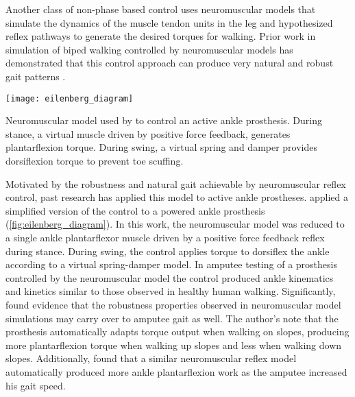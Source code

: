 Another class of non-phase based control uses neuromuscular models that simulate
the dynamics of the muscle tendon units in the leg and hypothesized reflex
pathways to generate the desired torques for walking. Prior work in simulation
of biped walking controlled by neuromuscular models has demonstrated that this
control approach can produce very natural and robust gait patterns
\citep{geyer2010muscle,song2013integration,song2015neural}.
\begin{marginfigure}[1in]
    \centering
    \texttt{[image: eilenberg\_diagram]} 
    \caption[Neuromuscular model used by \citet{eilenberg2010control} to control
    an active ankle prosthesis.]{Neuromuscular model used by
    \citet{eilenberg2010control} to control an active ankle prosthesis. During
    stance, a virtual muscle driven by positive force feedback, generates
    plantarflexion torque. During swing, a virtual spring and damper provides
    dorsiflexion torque to prevent toe scuffing.}\label{fig:eilenberg_diagram}
\end{marginfigure}
Motivated by the robustness and natural gait achievable by neuromuscular reflex
control, past research has applied this model to active ankle prostheses.
\citet{eilenberg2010control} applied a simplified version of the control to a
powered ankle prosthesis (\cref{fig:eilenberg_diagram}). In this work, the
neuromuscular model was reduced to a single ankle plantarflexor muscle driven by
a positive force feedback reflex during stance. During swing, the control
applies torque to dorsiflex the ankle according to a virtual spring-damper
model. In amputee testing of a prosthesis controlled by the neuromuscular model
the control produced ankle kinematics and kinetics similar to those observed in
healthy human walking. Significantly, \citeauthor{eilenberg2010control} found
evidence that the robustness  properties observed in neuromuscular model
simulations may carry over to amputee gait as well. The author's note that the
prosthesis automatically adapts torque output when walking on slopes, producing
more plantarflexion torque when walking up slopes and less when walking down
slopes. Additionally, \citet{markowitz2011speed} found that a similar
neuromuscular reflex model automatically produced more ankle plantarflexion work
as the amputee increased his gait speed.

